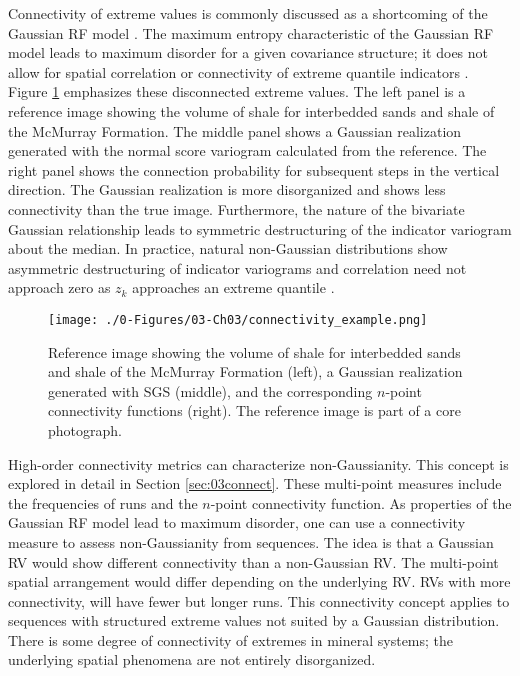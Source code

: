 Connectivity of extreme values is commonly discussed as a shortcoming of the Gaussian \gls{RF} model \citep{journel1993entropy,journel1989nongaussian,yan2020multivariate,guthke2017link,kerrou2008issues}. The maximum entropy characteristic of the Gaussian \gls{RF} model leads to maximum disorder for a given covariance structure; it does not allow for spatial correlation or connectivity of extreme quantile indicators \citep{kerrou2008issues}. Figure \ref{fig:connectivity_example} emphasizes these disconnected extreme values. The left panel is a reference image showing the volume of shale for interbedded sands and shale of the McMurray Formation. The middle panel shows a Gaussian realization generated with the normal score variogram calculated from the reference. The right panel shows the connection probability for subsequent steps in the vertical direction. The Gaussian realization is more disorganized and shows less connectivity than the true image. Furthermore, the nature of the bivariate Gaussian relationship leads to symmetric destructuring of the indicator variogram about the median. In practice, natural non-Gaussian distributions show asymmetric destructuring of indicator variograms \citep{vincent2021multipleindicator} and correlation need not approach zero as $z_{k}$ approaches an extreme quantile \citep{journel1989nongaussian}.

\begin{figure}[htb!]
    \centering
    \texttt{[image: ./0-Figures/03-Ch03/connectivity\_example.png]}
    \caption{Reference image showing the volume of shale for interbedded sands and shale of the McMurray Formation (left), a Gaussian realization generated with \gls{SGS} (middle), and the corresponding $n$-point connectivity functions (right). The reference image is part of a core photograph.}
    \label{fig:connectivity_example}
\end{figure}

High-order connectivity metrics can characterize non-Gaussianity. This concept is explored in detail in Section \ref{sec:03connect}. These multi-point measures include the frequencies of runs and the $n$-point connectivity function. As properties of the Gaussian \gls{RF} model lead to maximum disorder, one can use a connectivity measure to assess non-Gaussianity from sequences. The idea is that a Gaussian \gls{RV} would show different connectivity than a non-Gaussian \gls{RV}. The multi-point spatial arrangement would differ depending on the underlying \gls{RV}. \Glspl{RV} with more connectivity, will have fewer but longer runs. This connectivity concept applies to sequences with structured extreme values not suited by a Gaussian distribution. There is some degree of connectivity of extremes in mineral systems; the underlying spatial phenomena are not entirely disorganized.

